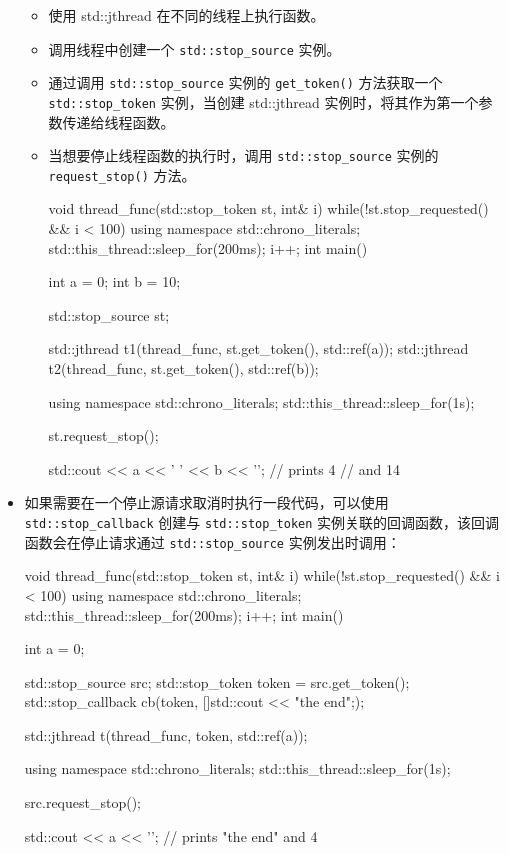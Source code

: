\begin{itemize}
\begin{itemize}
\item
使用 std::jthread 在不同的线程上执行函数。

\item
调用线程中创建一个 \verb|std::stop_source| 实例。

\item
通过调用 \verb|std::stop_source| 实例的 \verb|get_token()| 方法获取一个 \verb|std::stop_token| 实例，当创建 std::jthread 实例时，将其作为第一个参数传递给线程函数。

\item
当想要停止线程函数的执行时，调用 \verb|std::stop_source| 实例的 \verb|request_stop()| 方法。

\begin{cpp}
void thread_func(std::stop_token st, int& i)
{
    while(!st.stop_requested() && i < 100)
    {
        using namespace std::chrono_literals;
        std::this_thread::sleep_for(200ms);
        i++;
    }
}
int main()
{
    int a = 0;
    int b = 10;

    std::stop_source st;

    std::jthread t1(thread_func, st.get_token(),
    std::ref(a));
    std::jthread t2(thread_func, st.get_token(),
    std::ref(b));

    using namespace std::chrono_literals;
    std::this_thread::sleep_for(1s);

    st.request_stop();

    std::cout << a << ' ' << b << '\n';       // prints 4
    // and 14
}
\end{cpp}
\end{itemize}

\item
如果需要在一个停止源请求取消时执行一段代码，可以使用 \verb|std::stop_callback| 创建与 \verb|std::stop_token| 实例关联的回调函数，该回调函数会在停止请求通过 \verb|std::stop_source| 实例发出时调用：

\begin{cpp}
void thread_func(std::stop_token st, int& i)
{
    while(!st.stop_requested() && i < 100)
    {
        using namespace std::chrono_literals;
        std::this_thread::sleep_for(200ms);
        i++;
    }
}
int main()
{
    int a = 0;

    std::stop_source src;
    std::stop_token token = src.get_token();
    std::stop_callback cb(token, []{std::cout << "the end\n";});

    std::jthread t(thread_func, token, std::ref(a));

    using namespace std::chrono_literals;
    std::this_thread::sleep_for(1s);

    src.request_stop();

    std::cout << a << '\n';       // prints "the end" and 4
}
\end{cpp}

\end{itemize}

